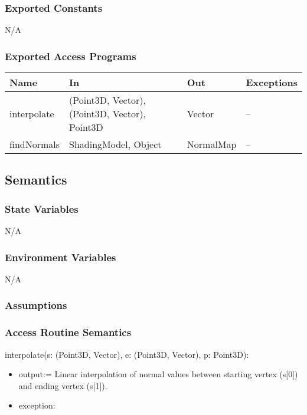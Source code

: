 \documentclass[12pt, titlepage]{article}
\begin{document}
\subsubsection{Exported Constants}
N/A
\subsubsection{Exported Access Programs}
\begin{center}
	\begin{tabular}{p{3cm} p{4cm} p{2cm} p{4cm}}
		\hline
		\textbf{Name} & \textbf{In} & \textbf{Out} & \textbf{Exceptions} \\
		\hline
		interpolate & (Point3D, Vector), (Point3D, Vector), Point3D & Vector & 
		-- \\
		findNormals & ShadingModel, Object & NormalMap & -- \\
		\hline
	\end{tabular}
\end{center}

\subsection{Semantics}
\subsubsection{State Variables}
N/A
\subsubsection{Environment Variables}
N/A

\subsubsection{Assumptions}

\subsubsection{Access Routine Semantics}
\noindent interpolate(s: (Point3D, Vector), e: (Point3D, Vector), p: Point3D):
\begin{itemize}
	\item output:= Linear interpolation of normal values between starting 
	vertex (s[0]) and ending vertex (s[1]).\\
	\item exception: \\
\end{itemize}
\end{document}
